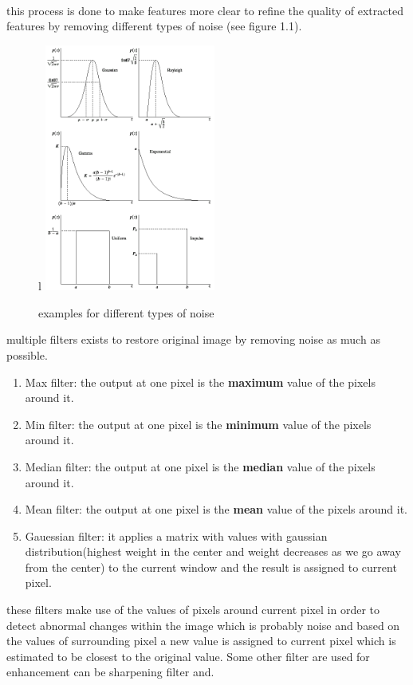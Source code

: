 \paragraph{}
this process is done to make features more clear to refine the quality of extracted features by removing different types of noise (see figure 1.1).\newline
\begin{figure}{l}
	\centering
	\includegraphics[width=0.5\textwidth]{CH1-introduction/sec2_image_processing/noise_types.png}
	\caption{examples for different types of noise}
\end{figure}
multiple filters exists to restore original image by removing noise as much as possible.
\begin{enumerate}
	\item Max filter: the output at one pixel is the \textbf{maximum} value of the pixels around it.
	\item Min filter: the output at one pixel is the \textbf{minimum} value of the pixels around it.
	\item Median filter: the output at one pixel is the \textbf{median} value of the pixels around it.
	\item Mean filter: the output at one pixel is the \textbf{mean} value of the pixels around it.
	\item Gauessian filter: it applies a matrix with values with gaussian distribution(highest weight in the center and weight decreases as we go away from the center) to the current window and the result is assigned to current pixel.
\end{enumerate}
these filters make use of the values of pixels around current pixel in order to detect abnormal changes within the image which is probably noise and based on the values of surrounding pixel a new value is assigned to current pixel which is estimated to be closest to the original value.\newline
Some other filter are used for enhancement can be sharpening filter and.

